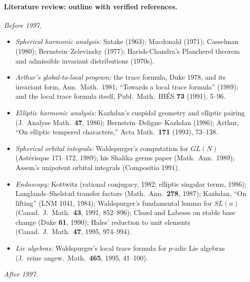 \documentclass[11pt]{article}
\begin{document}
\paragraph{Literature review: outline with verified references.}
\emph{Before 1997.}
\begin{itemize}
\item \emph{Spherical harmonic analysis:} Satake (1963); Macdonald (1971); Casselman (1980); Bernstein--Zelevinsky (1977); Harish-Chandra's Plancherel theorem and admissible invariant distributions (1970s).
\item \emph{Arthur's global-to-local program:} the trace formula, Duke 1978, and its invariant form, Ann.\ Math.\ 1981; ``Towards a local trace formula'' (1989); and the local trace formula itself, Publ.\ Math.\ IH\'ES \textbf{73} (1991), 5--96.
\item \emph{Elliptic harmonic analysis:} Kazhdan's cuspidal geometry and elliptic pairing (J.\ Analyse Math.\ \textbf{47}, 1986); Bernstein--Deligne--Kazhdan (1986); Arthur, ``On elliptic tempered characters,'' Acta Math.\ \textbf{171} (1993), 73--138.
\item \emph{Spherical orbital integrals:} Waldspurger's computation for $GL(N)$ (Ast\'erisque 171--172, 1989); his Shalika germs paper (Math.\ Ann.\ 1989); Assem's unipotent orbital integrals (Compositio 1991).
\item \emph{Endoscopy:} Kottwitz (rational conjugacy, 1982; elliptic singular terms, 1986); Langlands--Shelstad transfer factors (Math.\ Ann.\ \textbf{278}, 1987); Kazhdan, ``On lifting'' (LNM 1041, 1984); Waldspurger's fundamental lemma for $SL(n)$ (Canad.\ J.\ Math.\ \textbf{43}, 1991, 852--896); Clozel and Labesse on stable base change (Duke \textbf{61}, 1990); Hales' reduction to unit elements (Canad.\ J.\ Math.\ \textbf{47}, 1995, 974--994).
\item \emph{Lie algebras:} Waldspurger's local trace formula for $p$-adic Lie algebras (J.\ reine angew.\ Math.\ \textbf{465}, 1995, 41--100).
\end{itemize}
\emph{After 1997.}
\end{document}
